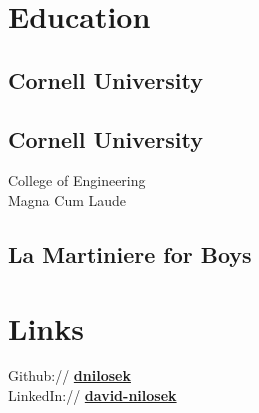 \documentclass[]{deedy-resume-openfont}
\begin{document}
%
%
\lastupdated

%
%

%
%

\begin{minipage}[t]{0.33\textwidth} 


\section{Education} 

\subsection{Cornell University}
\sectionsep

\subsection{Cornell University}
College of Engineering \\
Magna Cum Laude\\
\sectionsep

\subsection{La Martiniere for Boys}
\sectionsep


\section{Links} 
Github:// \href{https://github.com/dnilosek}{\bf dnilosek} \\
LinkedIn://  \href{https://www.linkedin.com/in/david-nilosek-aab5a696}{\bf david-nilosek} \\


\end{minipage}
\end{document}
